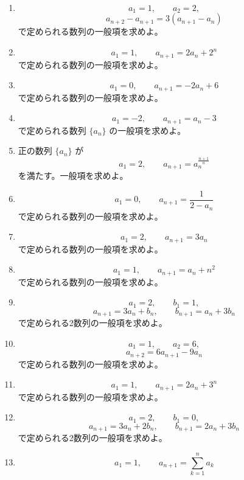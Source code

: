 \begin{enumerate}[label=\textbf{問\arabic*.},leftmargin=3.8em,format=\bookitemlink{practice-basic}{problem}{answer}]
\[            a_1=2,\qquad a_2=4,
          \]
              かつ
          \[
            a_{n+2}-a_{n+1}
            =-\frac12(a_{n+1}-a_n)
          \]
              を満たす数列の一般項を求めよ。
        \item \[
            a_1=1,\qquad a_2=2,
          \]
          \[
            a_{n+2}-a_{n+1}
            =3(a_{n+1}-a_n)
          \]
              で定められる数列の一般項を求めよ。
        \item \[
            a_1=1,\qquad
            a_{n+1}=2a_n+2^n
          \]
              で定められる数列の一般項を求めよ。
        \item \[
            a_1=0,\qquad a_{n+1}=-2a_n+6
          \]
              で定められる数列の一般項を求めよ。
        \item \[
            a_1=-2,\qquad a_{n+1}=a_n-3
          \]
              で定められる数列 \(\{a_n\}\) の一般項を求めよ。
        \item 正の数列 \(\{a_n\}\) が
          \[
            a_1=2,\qquad
            a_{n+1}=a_n^{\frac{n+1}{n}}
          \]
              を満たす。一般項を求めよ。
        \item \[
            a_1=0,\qquad
            a_{n+1}=\frac1{2-a_n}
          \]
              で定められる数列の一般項を求めよ。
        \item \[
            a_1=2,\qquad a_{n+1}=3a_n
          \]
              で定められる数列の一般項を求めよ。
        \item \[
            a_1=1,\qquad a_{n+1}=a_n+n^2
          \]
              で定められる数列の一般項を求めよ。
        \item \[
            a_1=2,\qquad b_1=1,
          \]
          \[
            a_{n+1}=3a_n+b_n,\qquad
            b_{n+1}=a_n+3b_n
          \]
              で定められる2数列の一般項を求めよ。
        \item \[
            a_1=1,\qquad a_2=6,
          \]
          \[
            a_{n+2}=6a_{n+1}-9a_n
          \]
              で定められる数列の一般項を求めよ。
        \item \[
            a_1=1,\qquad
            a_{n+1}=2a_n+3^n
          \]
              で定められる数列の一般項を求めよ。
        \item \[
            a_1=2,\qquad b_1=0,
          \]
          \[
            a_{n+1}=3a_n+2b_n,\qquad
            b_{n+1}=2a_n+3b_n
          \]
              で定められる2数列の一般項を求めよ。
        \item \[
            a_1=1,\qquad
            a_{n+1}=\sum_{k=1}^{n}a_k
\]
\end{enumerate}
